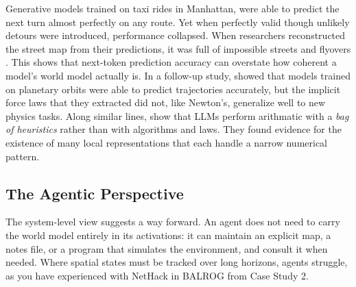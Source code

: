 Generative models trained on taxi rides in Manhattan, were able to predict the next turn almost perfectly on any route. Yet when perfectly valid though unlikely detours were introduced, performance collapsed. When researchers reconstructed the street map from their predictions, it was full of impossible streets and flyovers \citep{vafa2024eval}. This shows that next-token prediction accuracy can overstate how coherent a model's world model actually is. In a follow-up study, \citet{vafa2025foundation} showed that models trained on planetary orbits were able to predict trajectories accurately, but the implicit force laws that they extracted did not, like Newton's, generalize well to new physics tasks. Along similar lines, \citet{nikankin2025arith} show that LLMs perform arithmatic with a {\em bag of heuristics} rather than with algorithms and laws. They found evidence for the existence of many local representations that each handle a narrow numerical pattern.



\subsection{The Agentic Perspective}
The system-level view suggests a way forward. An agent does not need to carry the world model entirely in its activations: it can maintain an explicit map, a notes file, or a program that simulates the environment, and consult it when needed. Where spatial states must be tracked over long horizons, agents struggle, as you have experienced with NetHack in BALROG from Case Study 2.

